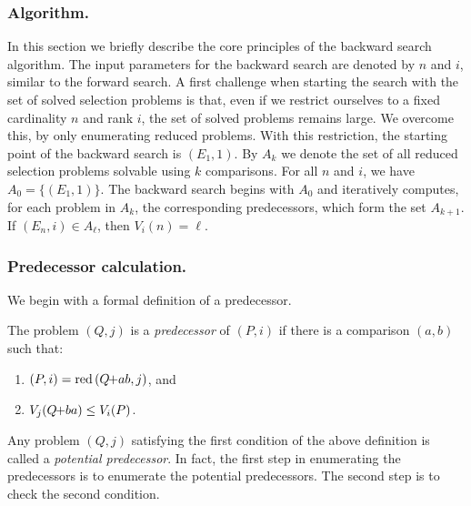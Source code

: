 \documentclass[a4paper,UKenglish,cleveref, autoref, thm-restate]{lipics-v2021}
\newcommand{\pchild}[3]{{#1}\kern-1pt{+}{#2}{#3}}
\newcommand{\reduced}[1]{\operatorname{red}{#1}}
\begin{document}
\subsubsection{Algorithm.} \label{sec:backward:algorithm}
In this section we briefly describe the core principles of the backward search algorithm.
The input parameters for the backward search are denoted by $n$ and $i$, similar to the forward search.
A first challenge when starting the search with the set of solved selection problems is that, even if we restrict ourselves to a fixed cardinality $n$ and rank $i$, the set of solved problems remains large.
We overcome this, by only enumerating reduced problems.
With this restriction, the starting point of the backward search is $(E_1, 1)$.
By $A_k$ we denote the set of all reduced selection problems solvable using $k$ comparisons.
For all $n$ and $i$, we have $A_0 = \{(E_1, 1)\}$.
The backward search begins with $A_0$ and iteratively computes, for each problem in $A_k$, the corresponding predecessors, which form the set $A_{k + 1}$.
If $(E_n, i) \in A_\ell$, then $V_i(n) = \ell$.

\subsubsection{Predecessor calculation.} \label{sec:backward:predecessor_calculation}
We begin with a formal definition of a predecessor.

\begin{definition}[Predecessor] \label{definition:predecessor_calculation}
  The problem $(Q, j)$ is a \emph{predecessor} of $(P, i)$ if there is a comparison $(a, b)$ such that:
  \begin{enumerate}
    \item $(P, i) = \reduced(\pchild{Q}{a}{b}, j)$, and
    \item $V_j(\pchild{Q}{b}{a}) \leq V_i(P)$.
  \end{enumerate}
\end{definition}

Any problem $(Q, j)$ satisfying the first condition of the above definition is called a \emph{potential predecessor}.
In fact, the first step in enumerating the predecessors is to enumerate the potential predecessors.
The second step is to check the second condition.
\end{document}
